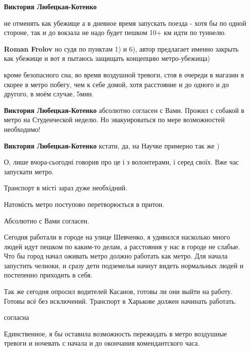 \begin{itemize}
\begin{itemize} %
\textbf{Виктория Любецкая-Котенко} 

не отменять как убежище а в дневное время запускать поезда - хотя бы по одной
стороне, так и до вокзала не надо будет пешком 10+ км идти по туннелю.

\textbf{Roman Frolov} но судя по пунктам 1) и 6), автор предлагает именно закрыть как убежище и вот я пытаюсь защищать концепцию метро-убежища)


кроме безопасного сна, во время воздушной тревоги, стоя в очереди в магазин я
скорее в метро побегу, чем к себе домой, хотя расстояние и до одного и до
другого, в моём случае, 5мин.

\textbf{Виктория Любецкая-Котенко} абсолютно согласен с Вами. Прожил с собакой в метро на Студенческой неделю.
Но эвакуироваться по мере возможностей необходимо!

\textbf{Виктория Любецкая-Котенко} кстати, да, на Научке примерно так же )
\end{itemize} %


О, лише вчора-сьогодні говорив про це і з волонтерами, і серед своїх. Вже час
запускати метро.

Транспорт в місті зараз дуже необхідний.

Натомість метро поступово перетворюється в притон.

Абсолютно с Вами согласен.


Сегодня работали в городе на улице Шевченко, я удивился насколько много людей
идут пешком по каким-то делам, а расстояния у нас в городе не слабые. Что бы
город начал оживать метро должно работать как метро. Для начала запустить
челноки, и сразу дети подземелья начнут видеть нормальных людей и постепенно
приходить в себя.

Так же сегодня опросил водителей Касанов, готовы ли они выйти на работу. Готовы
всё без исключений. Транспорт в Харькове должен начинать работать.

согласна


Единственное, я бы оставила возможность пережидать в метро воздушные тревоги и
ночевать с начала и до окончания комендантского часа.


\end{itemize}
